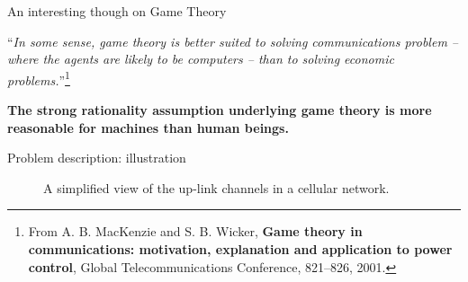 \begin{frame}{An interesting though on Game Theory}

    \begin{center}
        ``\textit{In some sense, game theory is better suited to solving communications
        problem -- where the agents are likely to be computers -- than to solving economic
        problems.}''\footnote{From 
        A. B. MacKenzie and S. B. Wicker, \textbf{Game theory in communications: motivation,
        explanation and application to power control}, {\color{gray}Global Telecommunications
        Conference, 821--826, 2001}.}
    \end{center}
    
    \pause
    \vspace{0.5cm}
    \textbf{{\color{green}The strong rationality assumption underlying game theory is more
    reasonable for machines than human beings.}}
\end{frame}


\begin{frame}{Problem description: illustration}
    \begin{figure}
        \centering
        \caption{A simplified view of the up-link channels in a cellular network.}
    \end{figure}
\end{frame}

